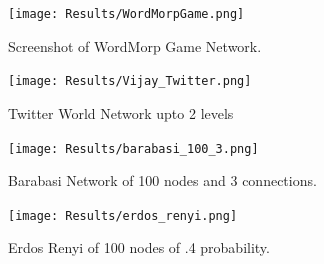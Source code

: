 \documentclass[a4paper,12pt]{article}
\begin{document}
\begin{figure}[htp]
\begin{center}
\texttt{[image: Results/WordMorpGame.png]}
\caption{Screenshot of WordMorp Game Network.}
\end{center}
\end{figure}

\begin{figure}[htp]
\begin{center}
\texttt{[image: Results/Vijay\_Twitter.png]}
\caption{Twitter World Network upto 2 levels}
\end{center}
\end{figure}

\begin{figure}[htp]
\begin{center}
\texttt{[image: Results/barabasi\_100\_3.png]}
\caption{Barabasi Network of 100 nodes and 3 connections.}
\end{center}
\end{figure}

\begin{figure}[htp]
\begin{center}
\texttt{[image: Results/erdos\_renyi.png]}
\caption{Erdos Renyi of 100 nodes of .4 probability.}
\end{center}
\end{figure}

\newpage                                                                                	
  

\end{document}
